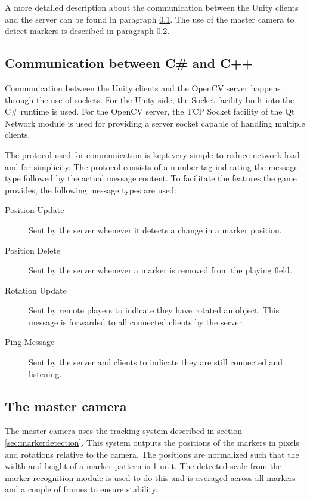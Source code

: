         A more detailed description about the communication between the Unity 
        clients and the server can be found in paragraph \ref{ssec:communication}.
        The use of the master camera to detect markers is described in paragraph
        \ref{ssec:mastercamera}.
                
        \subsection{Communication between C\# and C++} \label{ssec:communication}
            Communication between the Unity clients and the OpenCV server 
            happens through the use of sockets. For the Unity side, the Socket 
            facility built into the C\# runtime is used. For the OpenCV server, 
            the TCP Socket facility of the Qt Network module is used for 
            providing a server socket capable of handling multiple clients. 
            
            The protocol used for communication is kept very simple to reduce 
            network load and for simplicity. The protocol consists of a number
            tag indicating the message type followed by the actual message 
            content. To facilitate the features the game provides, the following
            message types are used:
            
            \begin{description}
                \item[Position Update] Sent by the server whenever it detects a 
                                       change in a marker position.
                \item[Position Delete] Sent by the server whenever a marker is
                                       removed from the playing field.
                \item[Rotation Update] Sent by remote players to indicate they 
                                       have rotated an object. This message is 
                                       forwarded to all connected clients by the
                                       server.
                \item[Ping Message]    Sent by the server and clients to indicate 
                                       they are still connected and listening.
            \end{description}
        
        \subsection{The master camera} \label{ssec:mastercamera}
            The master camera uses the tracking system described in section
            \ref{sec:markerdetection}. This system outputs the positions of the
            markers in pixels and rotations relative to the camera. The
            positions are normalized such that the width and height of a marker
            pattern is 1 unit. The detected scale from the marker recognition
            module is used to do this and is averaged across all markers and a
            couple of frames to ensure stability.

